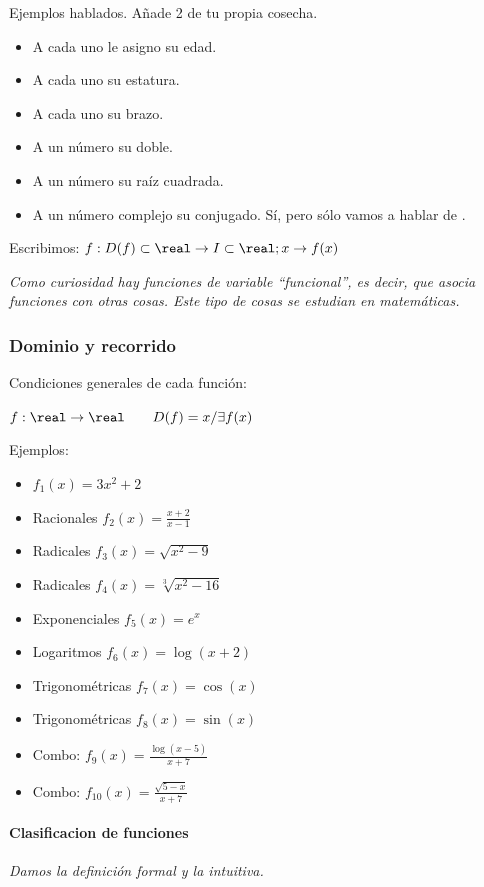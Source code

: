 \documentclass[palatino,nosec]{Docencia}
\begin{document}
Ejemplos hablados. Añade 2 de tu propia cosecha.
\begin{itemize}
	\item A cada uno le asigno su edad.
	\item A cada uno su estatura.
	\item A cada uno su brazo.
	\item A un número su doble.
	\item A un número su raíz cuadrada.
\end{itemize}

\begin{itemize}
	\item A un número complejo su conjugado.
	\subitem Sí, pero sólo vamos a hablar de . 
\end{itemize}

Escribimos:  $f: D(f)\subset\real \to I\subset\real; x\to f(x)$

\textit{Como curiosidad hay funciones de variable ``funcional'', es decir, que asocia funciones con otras cosas. Este tipo de cosas se estudian en matemáticas.}


\subsubsection{Dominio y recorrido} Condiciones generales de cada función:

$f:\real\to\real\quad\quad D(f) = {x / \exists f(x)}$

Ejemplos:
\begin{itemize}
	\item $f_1(x) = 3x^2+2$
	\item Racionales $f_2(x) = \frac{x+2}{x-1}$
	\item Radicales $f_3(x) = \sqrt{x^2-9}$
	\item Radicales $f_4(x) = \sqrt[3]{x^2-16}$
	\item Exponenciales $f_5(x) = e^x$
	\item Logaritmos $f_6(x) = \log(x+2)$
	\item Trigonométricas $f_7(x) = \cos(x)$
	\item Trigonométricas $f_8(x) = \sin(x)$
	\item Combo: $f_9(x) = \frac{\log(x-5)}{x+7}$
	\item Combo: $f_{10}(x) = \frac{\sqrt{5-x}}{x+7}$
\end{itemize}


\paragraph{Clasificacion de funciones} \textit{Damos la definición formal y la intuitiva.}
\end{document}
